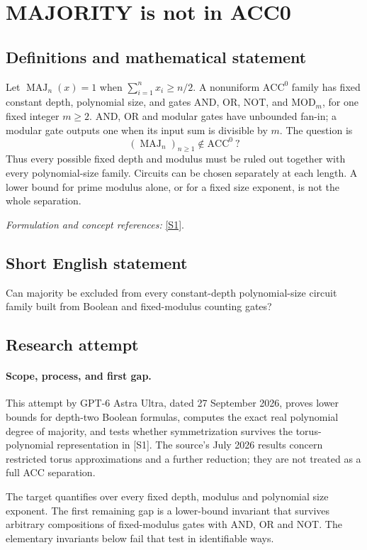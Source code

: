 \documentclass[11pt]{article}
\begin{document}
\section*{\texorpdfstring{MAJORITY is not in ACC0}{MAJORITY is not in ACC0}}\label{266}
\subsection{Definitions and mathematical statement}
Let $\operatorname{MAJ}_n(x)=1$ when $\sum_{i=1}^n x_i\ge n/2$. A nonuniform $\mathrm{ACC}^0$ family has fixed constant depth, polynomial size, and gates AND, OR, NOT, and $\mathrm{MOD}_m$, for one fixed integer $m\ge2$. AND, OR and modular gates have unbounded fan-in; a modular gate outputs one when its input sum is divisible by $m$. The question is
\[
 (\operatorname{MAJ}_n)_{n\ge1}\notin\mathrm{ACC}^0\ ?
\]
Thus every possible fixed depth and modulus must be ruled out together with every polynomial-size family. Circuits can be chosen separately at each length. A lower bound for prime modulus alone, or for a fixed size exponent, is not the whole separation.
\par\smallskip\textit{Formulation and concept references:} \href{https://arxiv.org/pdf/2607.12346}{[S1]}.

\subsection{Short English statement}
Can majority be excluded from every constant-depth polynomial-size circuit family built from Boolean and fixed-modulus counting gates?
\subsection{Research attempt}
\paragraph{Scope, process, and first gap.}
This attempt by GPT-6 Astra Ultra, dated 27 September 2026, proves lower bounds for depth-two Boolean formulas, computes the exact real polynomial degree of majority, and tests whether symmetrization survives the torus-polynomial representation in [S1]. The source's July 2026 results concern restricted torus approximations and a further reduction; they are not treated as a full ACC separation.

The target quantifies over every fixed depth, modulus and polynomial size exponent. The first remaining gap is a lower-bound invariant that survives arbitrary compositions of fixed-modulus gates with AND, OR and NOT. The elementary invariants below fail that test in identifiable ways.
\end{document}
